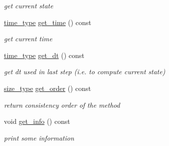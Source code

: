 \begin{DoxyCompactItemize}
\begin{DoxyCompactList}\small\item\em get current state \item\end{DoxyCompactList}\item 
\hypertarget{classhdnum_1_1RE_a81197d3660de7de56d85aa0f880ec9fa}{
\hyperlink{classhdnum_1_1RE_ae91da4bd459d3c8961c678e9ea53cdc7}{time\_\-type} \hyperlink{classhdnum_1_1RE_a81197d3660de7de56d85aa0f880ec9fa}{get\_\-time} () const }
\label{classhdnum_1_1RE_a81197d3660de7de56d85aa0f880ec9fa}

\begin{DoxyCompactList}\small\item\em get current time \item\end{DoxyCompactList}\item 
\hypertarget{classhdnum_1_1RE_a7083da825790713eaa4bd69f179924f9}{
\hyperlink{classhdnum_1_1RE_ae91da4bd459d3c8961c678e9ea53cdc7}{time\_\-type} \hyperlink{classhdnum_1_1RE_a7083da825790713eaa4bd69f179924f9}{get\_\-dt} () const }
\label{classhdnum_1_1RE_a7083da825790713eaa4bd69f179924f9}

\begin{DoxyCompactList}\small\item\em get dt used in last step (i.e. to compute current state) \item\end{DoxyCompactList}\item 
\hypertarget{classhdnum_1_1RE_a2eb79a70aef12f55b4aa34e09f4b8ad1}{
\hyperlink{classhdnum_1_1RE_ac69dd564f38accecac013e6fdfea00e1}{size\_\-type} \hyperlink{classhdnum_1_1RE_a2eb79a70aef12f55b4aa34e09f4b8ad1}{get\_\-order} () const }
\label{classhdnum_1_1RE_a2eb79a70aef12f55b4aa34e09f4b8ad1}

\begin{DoxyCompactList}\small\item\em return consistency order of the method \item\end{DoxyCompactList}\item 
\hypertarget{classhdnum_1_1RE_aae44debd78eaf94003a076920444f79b}{
void \hyperlink{classhdnum_1_1RE_aae44debd78eaf94003a076920444f79b}{get\_\-info} () const }
\label{classhdnum_1_1RE_aae44debd78eaf94003a076920444f79b}

\begin{DoxyCompactList}\small\item\em print some information \item\end{DoxyCompactList}\end{DoxyCompactItemize}


